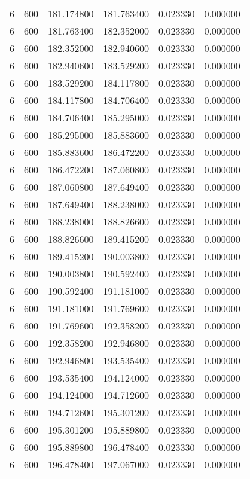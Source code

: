 \begin{longtable}{rrrrrr}
6 & 600 & 181.174800 & 181.763400 & 0.023330 & 0.000000 \\
6 & 600 & 181.763400 & 182.352000 & 0.023330 & 0.000000 \\
6 & 600 & 182.352000 & 182.940600 & 0.023330 & 0.000000 \\
6 & 600 & 182.940600 & 183.529200 & 0.023330 & 0.000000 \\
6 & 600 & 183.529200 & 184.117800 & 0.023330 & 0.000000 \\
6 & 600 & 184.117800 & 184.706400 & 0.023330 & 0.000000 \\
6 & 600 & 184.706400 & 185.295000 & 0.023330 & 0.000000 \\
6 & 600 & 185.295000 & 185.883600 & 0.023330 & 0.000000 \\
6 & 600 & 185.883600 & 186.472200 & 0.023330 & 0.000000 \\
6 & 600 & 186.472200 & 187.060800 & 0.023330 & 0.000000 \\
6 & 600 & 187.060800 & 187.649400 & 0.023330 & 0.000000 \\
6 & 600 & 187.649400 & 188.238000 & 0.023330 & 0.000000 \\
6 & 600 & 188.238000 & 188.826600 & 0.023330 & 0.000000 \\
6 & 600 & 188.826600 & 189.415200 & 0.023330 & 0.000000 \\
6 & 600 & 189.415200 & 190.003800 & 0.023330 & 0.000000 \\
6 & 600 & 190.003800 & 190.592400 & 0.023330 & 0.000000 \\
6 & 600 & 190.592400 & 191.181000 & 0.023330 & 0.000000 \\
6 & 600 & 191.181000 & 191.769600 & 0.023330 & 0.000000 \\
6 & 600 & 191.769600 & 192.358200 & 0.023330 & 0.000000 \\
6 & 600 & 192.358200 & 192.946800 & 0.023330 & 0.000000 \\
6 & 600 & 192.946800 & 193.535400 & 0.023330 & 0.000000 \\
6 & 600 & 193.535400 & 194.124000 & 0.023330 & 0.000000 \\
6 & 600 & 194.124000 & 194.712600 & 0.023330 & 0.000000 \\
6 & 600 & 194.712600 & 195.301200 & 0.023330 & 0.000000 \\
6 & 600 & 195.301200 & 195.889800 & 0.023330 & 0.000000 \\
6 & 600 & 195.889800 & 196.478400 & 0.023330 & 0.000000 \\
6 & 600 & 196.478400 & 197.067000 & 0.023330 & 0.000000 \\

\end{longtable}
